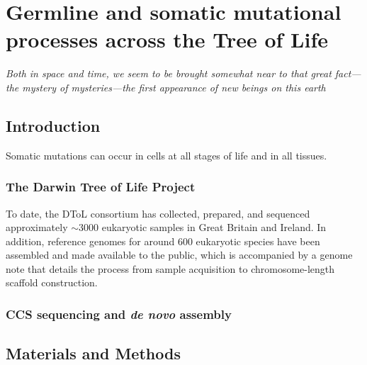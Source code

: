\chapter{Germline and somatic mutational processes across the Tree of Life}

\ifpdf
    \graphicspath{{Chapter3/Figs/Raster/}{Chapter3/Figs/PDF/}{Chapter3/Figs/}}
\else
    \graphicspath{{Chapter3/Figs/Vector/}{Chapter3/Figs/}}
\fi

\textit{Both in space and time, we seem to be brought somewhat near to that great fact—the mystery of mysteries—the first appearance of new beings on this earth \cite{}}
\begin{flushright}  \end{flushright}

\section{Introduction}

Somatic mutations can occur in cells at all stages of life and in all tissues. 

\subsection{The Darwin Tree of Life Project}

To date, the DToL consortium has collected, prepared, and sequenced approximately $\sim$3000 eukaryotic samples in Great Britain and Ireland. In addition, reference genomes for around 600 eukaryotic species have been assembled and made available to the public, which is accompanied by a genome note that details the process from sample acquisition to chromosome-length scaffold construction. 

\subsection{CCS sequencing and \textit{de novo} assembly}



\section{Materials and Methods}

